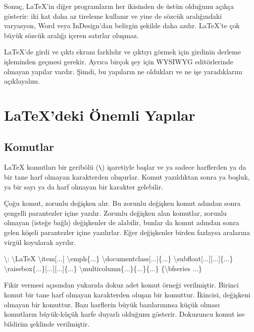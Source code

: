 \documentclass[
  10pt,
]{scrbook}
\newenvironment{Shaded}{\begin{snugshade}}{\end{snugshade}}
\newcommand{\NormalTok}[1]{#1}
\newcommand{\SpecialCharTok}[1]{\textcolor[rgb]{0.00,0.00,0.00}{#1}}
\begin{document}
Sonuç, LaTeX'in diğer programların her ikisinden de üstün olduğunu
açıkça gösterir: iki kat daha az tireleme kullanır ve yine de sözcük
aralığındaki varyasyon, Word veya InDesign'dan belirgin şekilde daha
azdır. LaTeX'te çok büyük sözcük aralığı içeren satırlar oluşmaz.

LaTeX'de girdi ve çıktı ekranı farklıdır ve
çıktıyı görmek için girdinin derleme işleminden geçmesi gerekir. Ayrıca
birçok şey için WYSIWYG editörlerinde olmayan yapılar vardır. Şimdi, bu
yapıların ne oldukları ve ne işe yaradıklarını açıklayalım.

\hypertarget{latexdeki-uxf6nemli-yapux131lar}{%
\section{LaTeX'deki Önemli Yapılar}\label{latexdeki-uxf6nemli-yapux131lar}}

\hypertarget{komutlar}{%
\subsection{Komutlar}\label{komutlar}}

LaTeX komutları bir geribölü (\texttt{\textbackslash{}}) işaretiyle başlar ve ya sadece
harflerden ya da bir tane harf olmayan karakterden oluşurlar. Komut
yazıldıktan sonra ya boşluk, ya bir sayı ya da harf olmayan bir karakter
gelebilir.

Çoğu komut, zorunlu değişken alır. Bu zorunlu değişken komut adından
sonra çengelli parantezler içine yazılır. Zorunlu değişken alan
komutlar, zorunlu olmayan (isteğe bağlı) değişkenler de alabilir, bunlar
da komut adından sonra gelen köşeli parantezler içine yazılırlar. Eğer
değişkenler birden fazlaysa aralarına virgül koyularak ayrılır.

\begin{Shaded}
\begin{Highlighting}[numbers=left,,]
\NormalTok{\textbackslash{}}\SpecialCharTok{:}
\NormalTok{\textbackslash{}LaTeX}
\NormalTok{\textbackslash{}item[...]}
\NormalTok{\textbackslash{}emph\{...\}}
\NormalTok{\textbackslash{}documentclass[...]\{...\}}
\NormalTok{\textbackslash{}subfloat[...][...]\{...\}}
\NormalTok{\textbackslash{}raisebox\{...\}[...][...]\{...\}}
\NormalTok{\textbackslash{}multicolumn\{...\}\{...\}\{...\}}
\NormalTok{\{\textbackslash{}bfseries ...\}}
\end{Highlighting}
\end{Shaded}

Fikir vermesi açısından yukarıda dokuz adet komut örneği verilmiştir.
Birinci komut bir tane harf olmayan karakterden oluşan bir komuttur.
İkincisi, değişkeni olmayan bir komuttur. Bazı harflerin büyük
bazılarınınsa küçük olması komutların büyük-küçük harfe duyarlı olduğunu
gösterir. Dokuzuncu komut ise bildirim şeklinde verilmiştir.
\end{document}
